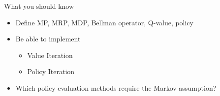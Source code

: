 \documentclass[aspectratio=169]{../latex_main/tntbeamer}  %
\begin{document}
\begin{frame}[c]{What you should know}

\begin{itemize}
	\item  Define MP, MRP, MDP, Bellman operator, Q-value, policy
	\item Be able to implement
	\begin{itemize}
		\item Value Iteration
		\item Policy Iteration
	\end{itemize}
	\item Which policy evaluation methods require the Markov assumption?
\end{itemize}

\end{frame}
\end{document}
